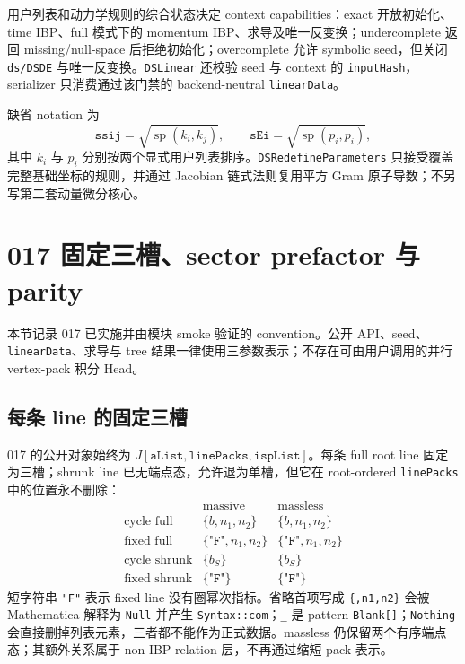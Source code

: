 ﻿\documentclass[a4paper,11pt]{article}
\begin{document}
用户列表和动力学规则的综合状态决定 context capabilities：exact 开放初始化、time IBP、full 模式下的 momentum IBP、求导及唯一反变换；undercomplete 返回 missing/null-space 后拒绝初始化；overcomplete 允许 symbolic seed，但关闭 \texttt{ds/DSDE} 与唯一反变换。\texttt{DSLinear} 还校验 seed 与 context 的 \texttt{inputHash}，serializer 只消费通过该门禁的 backend-neutral \texttt{linearData}。

缺省 notation 为
\begin{equation}
 \texttt{ssij}=\sqrt{\operatorname{sp}(k_i,k_j)},\qquad
 \texttt{sEi}=\sqrt{\operatorname{sp}(p_i,p_i)},
\end{equation}
其中 $k_i$ 与 $p_i$ 分别按两个显式用户列表排序。\texttt{DSRedefineParameters} 只接受覆盖完整基础坐标的规则，并通过 Jacobian 链式法则复用平方 Gram 原子导数；不另写第二套动量微分核心。

\section{017 固定三槽、sector prefactor 与 parity}

本节记录 017 已实施并由模块 smoke 验证的 convention。公开 API、seed、\texttt{linearData}、求导与 tree 结果一律使用三参数表示；不存在可由用户调用的并行 vertex-pack 积分 Head。

\subsection{每条 line 的固定三槽}

017 的公开对象始终为 $J[\texttt{aList},\texttt{linePacks},\texttt{ispList}]$。每条 full root line 固定为三槽；shrunk line 已无端点态，允许退为单槽，但它在 root-ordered \texttt{linePacks} 中的位置永不删除：
\begin{equation}
 \begin{array}{c|cc}
 &\text{massive}&\text{massless}\\ \hline
 \text{cycle full}&\{b,n_1,n_2\}&\{b,n_1,n_2\}\\
 \text{fixed full}&\{\texttt{"F"},n_1,n_2\}&\{\texttt{"F"},n_1,n_2\}\\
 \text{cycle shrunk}&\{b_S\}&\{b_S\}\\
 \text{fixed shrunk}&\{\texttt{"F"}\}&\{\texttt{"F"}\}
 \end{array}
 \label{v017FixedThreeSlotSchema}
\end{equation}
短字符串 \texttt{"F"} 表示 fixed line 没有圈幂次指标。省略首项写成 \texttt{\{,n1,n2\}} 会被 Mathematica 解释为 \texttt{Null} 并产生 \texttt{Syntax::com}；\texttt{\_} 是 pattern \texttt{Blank[]}；\texttt{Nothing} 会直接删掉列表元素，三者都不能作为正式数据。massless 仍保留两个有序端点态；其额外关系属于 non-IBP relation 层，不再通过缩短 pack 表示。
\end{document}
